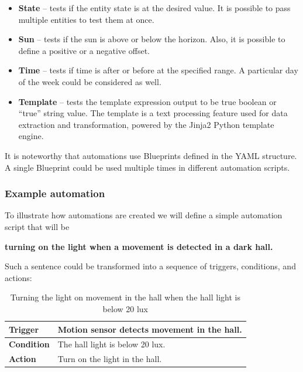 \documentclass[fleqn,10pt]{olplainarticle}
\begin{document}
\begin{itemize}
    \item \textbf{State} – tests if the entity state is at the desired value. It is possible to pass multiple entities to test them at once.
    \item \textbf{Sun} – tests if the sun is above or below the horizon. Also, it is possible to define a positive or a negative offset.
    \item \textbf{Time} – tests if time is after or before at the specified range. A particular day of the week could be considered as well.
    \item \textbf{Template} – tests the template expression output to be true boolean or “true” string value. The template is a text processing feature used for data extraction and transformation, powered by the Jinja2 Python template engine.
\end{itemize}

\vskip10pt

It is noteworthy that automations use Blueprints defined in the YAML structure. A single Blueprint could be used multiple times in different automation scripts.


\subsubsection{Example automation}

To illustrate how automations are created we will define a simple automation script that will be

\begin{center}
    \textbf{turning on the light when a movement is detected in a dark hall.}
\end{center}

\noindent Such a sentence could be transformed into a sequence of triggers, conditions, and actions:


\begin{table}[h]
\begin{tabular}{p{3cm} p{10cm}} \toprule
    \textbf{Trigger} & Motion sensor detects movement in the hall.\\ \bottomrule
    \textbf{Condition} & The hall light is below 20 lux.\\ \bottomrule
    \textbf{Action} & Turn on the light in the hall.\\ \bottomrule
    \end{tabular}
    \caption{\label{tab:table2}Turning the light on movement in the hall when the hall light is below 20 lux}
    \end{table}
\end{document}
